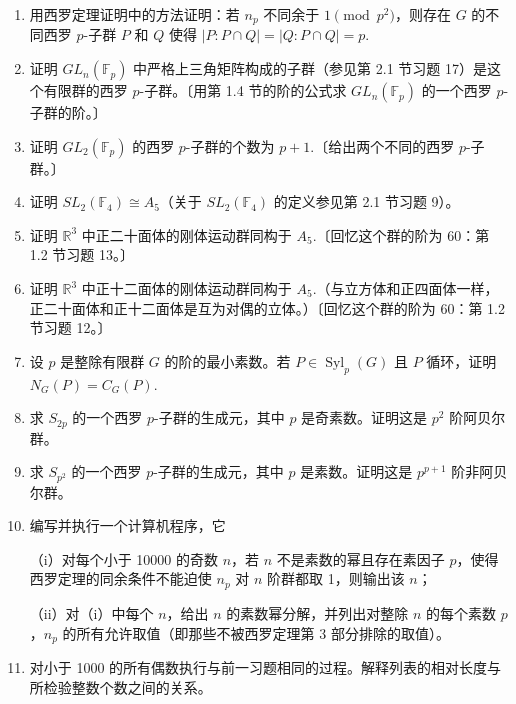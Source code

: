\begin{enumerate}
（d）设 \(\bar{G} = G/O_p(G)\). 证明 \(O_p(\bar{G}) = 1\)（即 \(\bar{G}\) 没有非平凡正规 \(p\)-子群）。

\item 用西罗定理证明中的方法证明：若 \(n_p\) 不同余于 \(1 \pmod{p^2}\)，则存在 \(G\) 的不同西罗 \(p\)-子群 \(P\) 和 \(Q\) 使得 \(|P : P \cap Q| = |Q : P \cap Q| = p\).

\item 证明 \(GL_n(\mathbb{F}_p)\) 中严格上三角矩阵构成的子群（参见第 2.1 节习题 17）是这个有限群的西罗 \(p\)-子群。〔用第 1.4 节的阶的公式求 \(GL_n(\mathbb{F}_p)\) 的一个西罗 \(p\)-子群的阶。〕

\item 证明 \(GL_2(\mathbb{F}_p)\) 的西罗 \(p\)-子群的个数为 \(p+1\).〔给出两个不同的西罗 \(p\)-子群。〕

\item 证明 \(SL_2(\mathbb{F}_4) \cong A_5\)（关于 \(SL_2(\mathbb{F}_4)\) 的定义参见第 2.1 节习题 9）。

\item 证明 \(\mathbb{R}^3\) 中正二十面体的刚体运动群同构于 \(A_5\).〔回忆这个群的阶为 60：第 1.2 节习题 13。〕

\item 证明 \(\mathbb{R}^3\) 中正十二面体的刚体运动群同构于 \(A_5\).（与立方体和正四面体一样，正二十面体和正十二面体是互为对偶的立体。）〔回忆这个群的阶为 60：第 1.2 节习题 12。〕

\item 设 \(p\) 是整除有限群 \(G\) 的阶的最小素数。若 \(P \in \operatorname{Syl}_p(G)\) 且 \(P\) 循环，证明 \(N_G(P) = C_G(P)\).

\item 求 \(S_{2p}\) 的一个西罗 \(p\)-子群的生成元，其中 \(p\) 是奇素数。证明这是 \(p^2\) 阶阿贝尔群。

\item 求 \(S_{p^2}\) 的一个西罗 \(p\)-子群的生成元，其中 \(p\) 是素数。证明这是 \(p^{p+1}\) 阶非阿贝尔群。

\item 编写并执行一个计算机程序，它

（i）对每个小于 10000 的奇数 \(n\)，若 \(n\) 不是素数的幂且存在素因子 \(p\)，使得西罗定理的同余条件不能迫使 \(n_p\) 对 \(n\) 阶群都取 1，则输出该 \(n\)；

（ii）对（i）中每个 \(n\)，给出 \(n\) 的素数幂分解，并列出对整除 \(n\) 的每个素数 \(p\)，\(n_p\) 的所有允许取值（即那些不被西罗定理第 3 部分排除的取值）。

\item 对小于 1000 的所有偶数执行与前一习题相同的过程。解释列表的相对长度与所检验整数个数之间的关系。


\end{enumerate}
